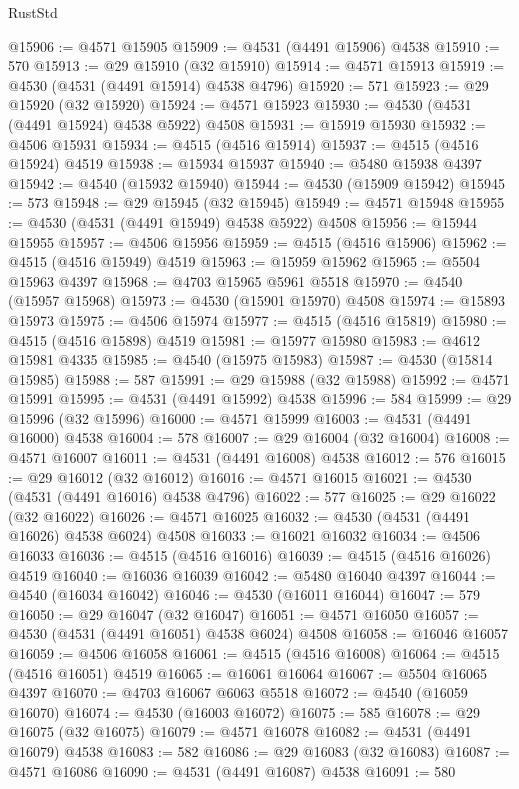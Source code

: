 \begin{lexlean}{RustStd}
\begin{coremodule}
@15906 := @4571 @15905
@15909 := @4531 (@4491 @15906) @4538
@15910 := 570
@15913 := @29 @15910 (@32 @15910)
@15914 := @4571 @15913
@15919 := @4530 (@4531 (@4491 @15914) @4538 @4796)
@15920 := 571
@15923 := @29 @15920 (@32 @15920)
@15924 := @4571 @15923
@15930 := @4530 (@4531 (@4491 @15924) @4538 @5922) @4508
@15931 := @15919 @15930
@15932 := @4506 @15931
@15934 := @4515 (@4516 @15914)
@15937 := @4515 (@4516 @15924) @4519
@15938 := @15934 @15937
@15940 := @5480 @15938 @4397
@15942 := @4540 (@15932 @15940)
@15944 := @4530 (@15909 @15942)
@15945 := 573
@15948 := @29 @15945 (@32 @15945)
@15949 := @4571 @15948
@15955 := @4530 (@4531 (@4491 @15949) @4538 @5922) @4508
@15956 := @15944 @15955
@15957 := @4506 @15956
@15959 := @4515 (@4516 @15906)
@15962 := @4515 (@4516 @15949) @4519
@15963 := @15959 @15962
@15965 := @5504 @15963 @4397
@15968 := @4703 @15965 @5961 @5518
@15970 := @4540 (@15957 @15968)
@15973 := @4530 (@15901 @15970) @4508
@15974 := @15893 @15973
@15975 := @4506 @15974
@15977 := @4515 (@4516 @15819)
@15980 := @4515 (@4516 @15898) @4519
@15981 := @15977 @15980
@15983 := @4612 @15981 @4335
@15985 := @4540 (@15975 @15983)
@15987 := @4530 (@15814 @15985)
@15988 := 587
@15991 := @29 @15988 (@32 @15988)
@15992 := @4571 @15991
@15995 := @4531 (@4491 @15992) @4538
@15996 := 584
@15999 := @29 @15996 (@32 @15996)
@16000 := @4571 @15999
@16003 := @4531 (@4491 @16000) @4538
@16004 := 578
@16007 := @29 @16004 (@32 @16004)
@16008 := @4571 @16007
@16011 := @4531 (@4491 @16008) @4538
@16012 := 576
@16015 := @29 @16012 (@32 @16012)
@16016 := @4571 @16015
@16021 := @4530 (@4531 (@4491 @16016) @4538 @4796)
@16022 := 577
@16025 := @29 @16022 (@32 @16022)
@16026 := @4571 @16025
@16032 := @4530 (@4531 (@4491 @16026) @4538 @6024) @4508
@16033 := @16021 @16032
@16034 := @4506 @16033
@16036 := @4515 (@4516 @16016)
@16039 := @4515 (@4516 @16026) @4519
@16040 := @16036 @16039
@16042 := @5480 @16040 @4397
@16044 := @4540 (@16034 @16042)
@16046 := @4530 (@16011 @16044)
@16047 := 579
@16050 := @29 @16047 (@32 @16047)
@16051 := @4571 @16050
@16057 := @4530 (@4531 (@4491 @16051) @4538 @6024) @4508
@16058 := @16046 @16057
@16059 := @4506 @16058
@16061 := @4515 (@4516 @16008)
@16064 := @4515 (@4516 @16051) @4519
@16065 := @16061 @16064
@16067 := @5504 @16065 @4397
@16070 := @4703 @16067 @6063 @5518
@16072 := @4540 (@16059 @16070)
@16074 := @4530 (@16003 @16072)
@16075 := 585
@16078 := @29 @16075 (@32 @16075)
@16079 := @4571 @16078
@16082 := @4531 (@4491 @16079) @4538
@16083 := 582
@16086 := @29 @16083 (@32 @16083)
@16087 := @4571 @16086
@16090 := @4531 (@4491 @16087) @4538
@16091 := 580

\end{coremodule}
\end{lexlean}
